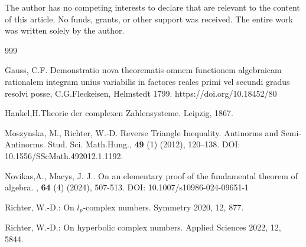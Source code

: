 \documentclass{amsart}
\theoremstyle{definition}
\theoremstyle{remark}
\numberwithin{equation}{section}
\begin{document}
The author has no competing interests to declare that are relevant to the content of this article.
No funds, grants, or other support was received. The entire work  was written solely by the author.

%
\begin{thebibliography}{999}

Gauss, C.F. Demonstratio nova theorematis omnem functionem algebraicam rationalem integram unius variabilis in factores reales primi vel secundi gradus resolvi posse, C.G.Fleckeisen, Helmstedt 1799.  https://doi.org/10.18452/80


Hankel,H.{Theorie der complexen Zahlensysteme.}  Leipzig, 1867.



 Moszynska, M., Richter, W.-D. %
 Reverse Triangle Inequality. Antinorms and Semi-Antinorms.
 {Stud. Sci. Math.Hung.}, \textbf{49} (1) (2012), 120--138.
{DOI: 10.1556/SScMath.492012.1.1192.}


     \newblock   Novikas,A., Macys, J. J.. %
     \newblock On an elementary proof of the fundamental theorem of algebra.
     , \textbf{64} (4) (2024), 507-513.
    {DOI: 10.1007/s10986-024-09651-1}



Richter, W.-D.:  On $l_p$-complex numbers. Symmetry {{2020}}, 12, 877.

Richter, W.-D.: On hyperbolic complex numbers. Applied Sciences 2022, 12, 5844.

\end{thebibliography}
\end{document}
